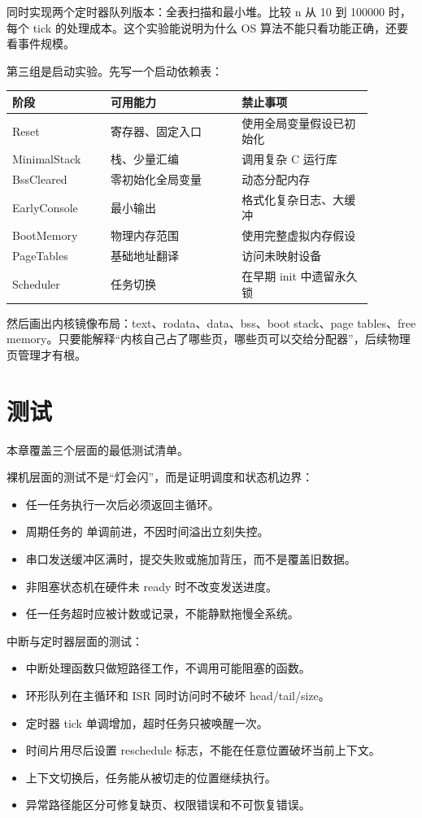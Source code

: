 同时实现两个定时器队列版本：全表扫描和最小堆。比较 n 从 10 到 100000 时，每个 tick 的处理成本。这个实验能说明为什么 OS 算法不能只看功能正确，还要看事件规模。

第三组是启动实验。先写一个启动依赖表：

\begin{longtable}{p{0.24\linewidth}p{0.32\linewidth}p{0.32\linewidth}}
\toprule
阶段 & 可用能力 & 禁止事项 \\
\midrule
Reset & 寄存器、固定入口 & 使用全局变量假设已初始化 \\
MinimalStack & 栈、少量汇编 & 调用复杂 C 运行库 \\
BssCleared & 零初始化全局变量 & 动态分配内存 \\
EarlyConsole & 最小输出 & 格式化复杂日志、大缓冲 \\
BootMemory & 物理内存范围 & 使用完整虚拟内存假设 \\
PageTables & 基础地址翻译 & 访问未映射设备 \\
Scheduler & 任务切换 & 在早期 init 中遗留永久锁 \\
\bottomrule
\end{longtable}

然后画出内核镜像布局：text、rodata、data、bss、boot stack、page tables、free memory。只要能解释“内核自己占了哪些页，哪些页可以交给分配器”，后续物理页管理才有根。

\section{测试}

本章覆盖三个层面的最低测试清单。

裸机层面的测试不是“灯会闪”，而是证明调度和状态机边界：

\begin{itemize}
\tightlist
\item 任一任务执行一次后必须返回主循环。
\item 周期任务的  单调前进，不因时间溢出立刻失控。
\item 串口发送缓冲区满时，提交失败或施加背压，而不是覆盖旧数据。
\item 非阻塞状态机在硬件未 ready 时不改变发送进度。
\item 任一任务超时应被计数或记录，不能静默拖慢全系统。
\end{itemize}

中断与定时器层面的测试：

\begin{itemize}
\tightlist
\item 中断处理函数只做短路径工作，不调用可能阻塞的函数。
\item 环形队列在主循环和 ISR 同时访问时不破坏 head/tail/size。
\item 定时器 tick 单调增加，超时任务只被唤醒一次。
\item 时间片用尽后设置 reschedule 标志，不能在任意位置破坏当前上下文。
\item 上下文切换后，任务能从被切走的位置继续执行。
\item 异常路径能区分可修复缺页、权限错误和不可恢复错误。
\end{itemize}

